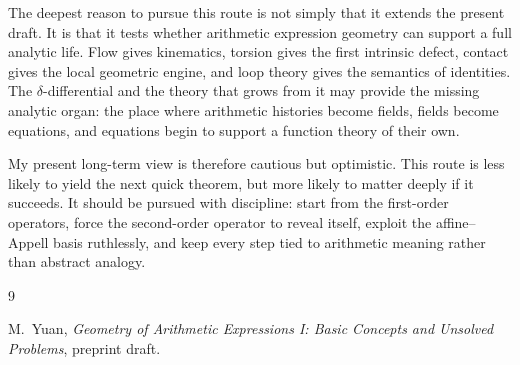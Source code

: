 \documentclass[11pt]{article}
\begin{document}
The deepest reason to pursue this route is not simply that it extends the present draft. It is that it tests whether arithmetic expression geometry can support a full analytic life. Flow gives kinematics, torsion gives the first intrinsic defect, contact gives the local geometric engine, and loop theory gives the semantics of identities. The $\delta$-differential and the theory that grows from it may provide the missing analytic organ: the place where arithmetic histories become fields, fields become equations, and equations begin to support a function theory of their own.

My present long-term view is therefore cautious but optimistic. This route is less likely to yield the next quick theorem, but more likely to matter deeply if it succeeds. It should be pursued with discipline: start from the first-order operators, force the second-order operator to reveal itself, exploit the affine--Appell basis ruthlessly, and keep every step tied to arithmetic meaning rather than abstract analogy.

\begin{thebibliography}{9}

M.~Yuan,
\emph{Geometry of Arithmetic Expressions I: Basic Concepts and Unsolved Problems},
preprint draft.

\end{thebibliography}
\end{document}
